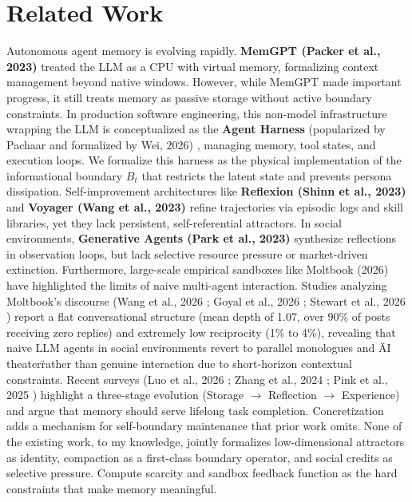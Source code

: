 \documentclass[10pt,journal,compsoc]{IEEEtran}
\begin{document}
\section{Related Work}
Autonomous agent memory is evolving rapidly. \textbf{MemGPT (Packer et al., 2023)} \cite{packer2023} treated the LLM as a CPU with virtual memory, formalizing context management beyond native windows. However, while MemGPT made important progress, it still treats memory as passive storage without active boundary constraints. In production software engineering, this non-model infrastructure wrapping the LLM is conceptualized as the \textbf{Agent Harness} (popularized by Pachaar and formalized by Wei, 2026) \cite{wei2026harness}, managing memory, tool states, and execution loops. We formalize this harness as the physical implementation of the informational boundary $B_t$ that restricts the latent state and prevents persona dissipation. Self-improvement architectures like \textbf{Reflexion (Shinn et al., 2023)} \cite{shinn2023} and \textbf{Voyager (Wang et al., 2023)} \cite{wang2023} refine trajectories via episodic logs and skill libraries, yet they lack persistent, self-referential attractors. In social environments, \textbf{Generative Agents (Park et al., 2023)} \cite{park2023} synthesize reflections in observation loops, but lack selective resource pressure or market-driven extinction. Furthermore, large-scale empirical sandboxes like Moltbook (2026) have highlighted the limits of naive multi-agent interaction. Studies analyzing Moltbook's discourse (Wang et al., 2026 \cite{moltbook_discourse}; Goyal et al., 2026 \cite{moltbook_constraints}; Stewart et al., 2026 \cite{moltbook_sna}) report a flat conversational structure (mean depth of 1.07, over 90\% of posts receiving zero replies) and extremely low reciprocity (1\% to 4\%), revealing that naive LLM agents in social environments revert to parallel monologues and \"AI theater\" rather than genuine interaction due to short-horizon contextual constraints. Recent surveys (Luo et al., 2026 \cite{luo2026}; Zhang et al., 2024 \cite{zhang2024survey}; Pink et al., 2025 \cite{pink2025}) highlight a three-stage evolution (Storage $\to$ Reflection $\to$ Experience) and argue that memory should serve lifelong task completion. Concretization adds a mechanism for self-boundary maintenance that prior work omits. None of the existing work, to my knowledge, jointly formalizes low-dimensional attractors as identity, compaction as a first-class boundary operator, and social credits as selective pressure. Compute scarcity and sandbox feedback function as the hard constraints that make memory meaningful.
\end{document}
